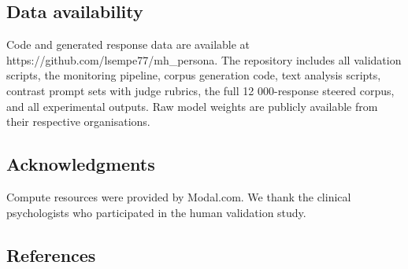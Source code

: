 \documentclass[
  10pt,
  a4paper,
  onecolumn]{article}
\begin{document}
\subsection{Data availability}\label{data-availability}

Code and generated response data are available at
https://github.com/lsempe77/mh\_persona. The repository includes all
validation scripts, the monitoring pipeline, corpus generation code,
text analysis scripts, contrast prompt sets with judge rubrics, the full
12 000-response steered corpus, and all experimental outputs. Raw model
weights are publicly available from their respective organisations.

\subsection{Acknowledgments}\label{acknowledgments}

Compute resources were provided by Modal.com. We thank the clinical
psychologists who participated in the human validation study.

\subsection*{References}\label{references}
\end{document}
